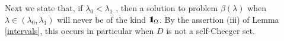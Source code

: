 \documentclass[reqno,11pt]{amsart}
\theoremstyle{definition}
\numberwithin{equation}{section}
\def\ov{\overline}
\DeclareMathOperator{\Div}{div}
\newcommand{\DD}{\mathcal{D}}
\newcommand{\RR}{\mathbb{R}}
\newcommand{\tinm}[1]{\text{\;#1\;}}
\newcommand{\1}{{{\bf 1}\kern-0,28em\rm l}}
\newcommand{\one}{{{\bf 1}\kern-0,28em\rm l}}
\newcommand{\red}[1]{{\color{red}#1}}
\def\l{\lambda}
\begin{document}
%
%
%
% 
%
%
Next we  state that, if $\lambda_0 <\lambda_1$ , then a solution to problem $\beta(\lambda)$ when $\l\in(\l_0,\l_1)$ will never be of the kind $\one_\Omega$. By the assertion (iii) of Lemma \ref{intervals}, this occurs in particular when $D$ is not a self-Cheeger set. 
\end{document}

